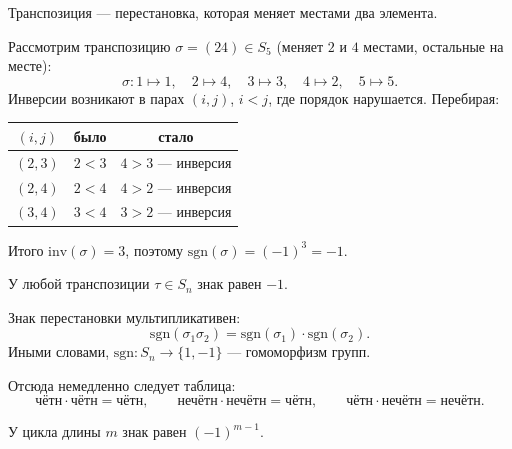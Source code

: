 \begin{definition}
    Транспозиция --- перестановка, которая меняет местами два элемента.
\end{definition}

\begin{example}
    Рассмотрим транспозицию $\sigma = (24) \in S_5$ (меняет $2$ и $4$ местами, остальные на месте):
    \[
        \sigma\colon 1 \mapsto 1,\quad 2 \mapsto 4,\quad 3 \mapsto 3,\quad 4 \mapsto 2,\quad 5 \mapsto 5.
    \]
    Инверсии возникают в парах $(i,j)$, $i < j$, где порядок нарушается. Перебирая:
    \begin{center}
    \begin{tabular}{c|c|c}
        $(i,j)$ & было & стало \\
        \hline
        $(2,3)$ & $2 < 3$ & $4 > 3$ --- инверсия \\
        $(2,4)$ & $2 < 4$ & $4 > 2$ --- инверсия \\
        $(3,4)$ & $3 < 4$ & $3 > 2$ --- инверсия \\
    \end{tabular}
    \end{center}
    Итого $\mathrm{inv}(\sigma) = 3$, поэтому $\mathrm{sgn}(\sigma) = (-1)^3 = -1$.
\end{example}

\begin{stmt}
    У любой транспозиции $\tau \in S_n$ знак равен $-1$.
\end{stmt}

\begin{stmt}
    Знак перестановки мультипликативен:
    \[
        \mathrm{sgn}(\sigma_1 \sigma_2) = \mathrm{sgn}(\sigma_1)\cdot\mathrm{sgn}(\sigma_2).
    \]
    Иными словами, $\mathrm{sgn}\colon S_n \to \{1,-1\}$ --- гомоморфизм групп.

    Отсюда немедленно следует таблица:
    \[
        \text{чётн} \cdot \text{чётн} = \text{чётн}, \qquad
        \text{нечётн} \cdot \text{нечётн} = \text{чётн}, \qquad
        \text{чётн} \cdot \text{нечётн} = \text{нечётн}.
    \]
\end{stmt}

\begin{stmt}
    У цикла длины $m$ знак равен $(-1)^{m-1}$.
\end{stmt}

